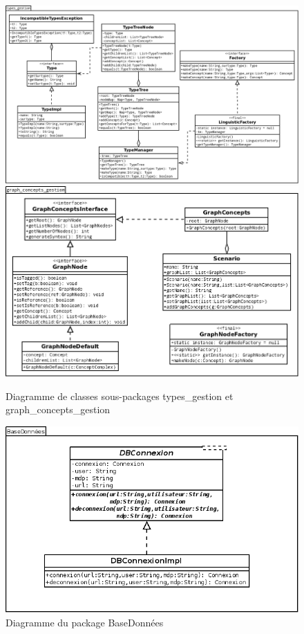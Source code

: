 \documentclass[12pt]{report}
\begin{document}
\begin{figure}[h!]
\begin{center}
\includegraphics[scale=0.4]{DiagLinguistic_types_gestion.png}
\includegraphics[scale=0.5]{DiagLinguistic_graph_concepts_gestion.png}
\caption{Diagramme de classes sous-packages types\_gestion et graph\_concepts\_gestion}
\end{center}
\end{figure}

\begin{figure}[h!]
\begin{center}
\includegraphics[scale=0.5]{DiagBD.png}
\caption{Diagramme du package BaseDonnées}
\end{center}
\end{figure}
\end{document}
